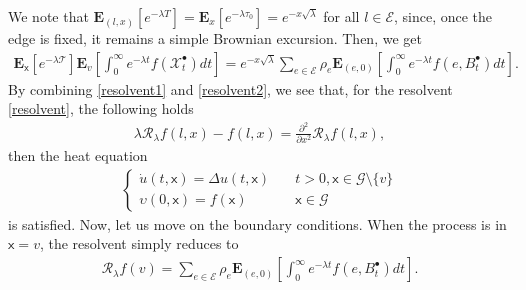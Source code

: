 \documentclass[11pt,a4paper]{article}
\theoremstyle{plain}
\theoremstyle{definition}
\theoremstyle{remark}
\begin{document}
		We note that $\mathbf{E}_{(l,x)}[e^{-\lambda T}]=\mathbf{E}_{x}[e^{-\lambda \tau_0}]= e^{-x \sqrt{\lambda}}$ for all $l \in \mathcal{E}$, since, once the edge is fixed, it remains a simple Brownian excursion. Then, we get
		\begin{align}
			\label{resolvent2}
			\mathbf{E}_\mathsf{x}\left[e^{-\lambda \mathcal{T}}\right] \mathbf{E}_v\left[\int_{0}^{\infty} e^{-\lambda t} f(\mathcal{X}^\bullet_t) dt\right] =  e^{-x \sqrt{\lambda}}  \sum_{e \in \mathcal{E}} \rho_e \mathbf{E}_{(e,0)}  \left[\int_0^\infty e^{-\lambda t} f(e, B^\bullet_t) dt\right].
		\end{align}
		By combining \eqref{resolvent1} and  \eqref{resolvent2}, we see that, for the resolvent \eqref{resolvent}, the following holds
		\begin{align*}
			\lambda \mathcal{R}_\lambda f(l,x) - f(l, x)= \frac{\partial^2}{\partial x^2} \mathcal{R}_\lambda f(l,x),
		\end{align*}
		then the heat equation 
		\begin{align*}
			\begin{cases}
				\dot{u}(t,\mathsf{x})= \Delta u(t,\mathsf{x}) \quad &t>0, \mathsf{x} \in \mathcal{G}\setminus \{v\} \\
				\upsilon(0,\mathsf{x})=f(\mathsf{x}) \quad &\mathsf{x} \in \mathcal{G}
			\end{cases}
		\end{align*}
		is satisfied. Now, let us move on the boundary conditions. When the process is in $\mathsf{x}=v$, the resolvent simply reduces to
		\begin{align*}
			\mathcal{R}_\lambda f(v)= \sum_{e \in \mathcal{E}} \rho_e \mathbf{E}_{(e,0)}  \left[\int_0^\infty e^{-\lambda t} f(e, B^\bullet_t) dt\right].
		\end{align*}
\end{document}
